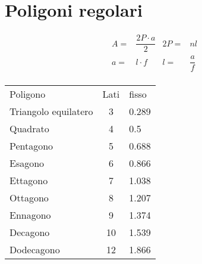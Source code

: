 \section{Poligoni regolari}
\begin{tcolorbox}[sidebyside,righthand width=9cm,colback=white,colframe=white,fonttitle=\bfseries	]
	
	\tcblower
	\begin{align}
	A=&\dfrac{2P\cdot a}{2} & 2P=&nl	\\
	a=&l\cdot f & l=&\dfrac{a}{f}	\\
	\end{align}
\end{tcolorbox}
\begin{center}
	\begin{tabular}{lcl}
		\toprule
Poligono	&  Lati&  fisso\\ 
Triangolo equilatero	& 3 & 0.289 \\ 
Quadrato	& 4 & 0.5 \\ 
Pentagono	& 5 &0.688  \\ 
Esagono	& 6 &0.866  \\ 
Ettagono	& 7 &1.038 \\ 
Ottagono	& 8 &1.207  \\ 
Ennagono	& 9&  1.374\\ 
Decagono	& 10 & 1.539 \\ 
Dodecagono	&  12&  1.866\\ 
\bottomrule
\end{tabular}
\end{center}
